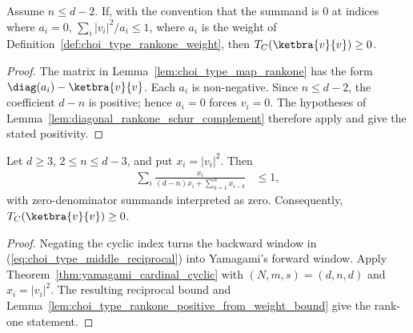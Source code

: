 \begin{lemma}
    \label{lem:choi_type_rankone_positive_from_weight_bound}
    \leanok
    Assume $n\le d-2$. If, with the convention that the summand is $0$ at
    indices where $a_i=0$, $\sum_i |v_i|^2/a_i\le 1$, where $a_i$ is the weight
    of Definition~\ref{def:choi_type_rankone_weight}, then
    $T_C(\ketbra{v}{v})\ge 0$.
\end{lemma}

\begin{proof}
    \leanok
    The matrix in Lemma~\ref{lem:choi_type_map_rankone} has the form
    $\diag(a_i)-\ketbra{v}{v}$. Each $a_i$ is non-negative. Since
    $n\le d-2$, the coefficient $d-n$ is positive; hence $a_i=0$ forces
    $v_i=0$. The hypotheses of
    Lemma~\ref{lem:diagonal_rankone_schur_complement} therefore apply and give
    the stated positivity.
\end{proof}

\begin{theorem}
    \label{thm:choi_type_middle_reciprocal}
    \leanok
    Let $d\ge3$, $2\le n\le d-3$, and put $x_i=|v_i|^2$. Then
    \begin{align}
        \sum_i\frac{x_i}{(d-n)x_i+\sum_{k=1}^{n}x_{i-k}}&\le1,
        \label{eq:choi_type_middle_reciprocal}
    \end{align}
    with zero-denominator summands interpreted as zero. Consequently,
    $T_C(\ketbra{v}{v})\ge0$.
\end{theorem}

\begin{proof}
    \leanok
    Negating the cyclic index turns the backward window in
    (\ref{eq:choi_type_middle_reciprocal}) into Yamagami's forward window.
    Apply Theorem~\ref{thm:yamagami_cardinal_cyclic} with
    $(N,m,s)=(d,n,d)$ and $x_i=|v_i|^2$. The resulting reciprocal bound and
    Lemma~\ref{lem:choi_type_rankone_positive_from_weight_bound} give the
    rank-one statement.
\end{proof}

